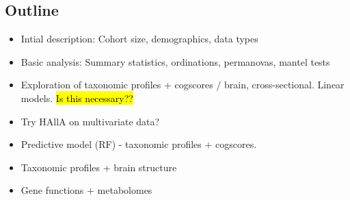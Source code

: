 \subsection*{Outline}

\begin{itemize}
  \item Intial description: Cohort size, demographics, data types
  \item Basic analysis: Summary statistics, ordinations, permanovas, mantel tests
  \item Exploration of taxonomic profiles + cogscores / brain, cross-sectional. Linear models. \hl{Is this necessary??}
  \item Try HAllA on multivariate data?
  \item Predictive model (RF) - taxonomic profiles + cogscores.
  \item Taxonomic profiles + brain structure
  \item Gene functions + metabolomes
\end{itemize}